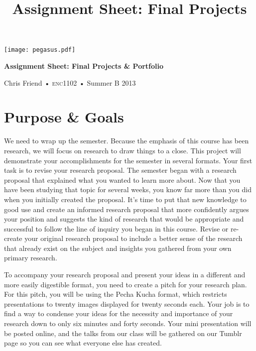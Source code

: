 \documentclass[11pt,oneside]{amsart}	%
\title[Final Projects]{Assignment Sheet: Final Projects}
\begin{document}
%
\thispagestyle{empty}

\vspace{-2in}
\begin{center}
\huge
{\texttt{[image: pegasus.pdf]}}

\textbf{Assignment Sheet: Final Projects \& Portfolio}

{\normalsize Chris Friend • \textsc{enc1102} • Summer B 2013}
\end{center}
\vspace{1.5\baselineskip}

\section{Purpose \& Goals} %
\label{sec:purpose}
We need to wrap up the semester. Because the emphasis of this course has been research, we will focus on research to draw things to a close. This project will demonstrate your accomplishments for the semester in several formats. Your first task is to revise your research proposal. The semester began with a research proposal that explained what you wanted to learn more about. Now that you have been studying that topic for several weeks, you know far more than you did when you initially created the proposal. It's time to put that new knowledge to good use and create an informed research proposal that more confidently argues your position and suggests the kind of research that would be appropriate and successful to follow the line of inquiry you began in this course. Revise or re-create your original research proposal to include a better sense of the research that already exist on the subject and insights you gathered from your own primary research.

To accompany your research proposal and present your ideas in a different and more easily digestible format, you need to create a pitch for your research plan. For this pitch, you will be using the Pecha Kucha format, which restricts presentations to twenty images displayed for twenty seconds each. Your job is to find a way to condense your ideas for the necessity and importance of your research down to only six minutes and forty seconds. Your mini presentation will be posted online, and the talks from our class will be gathered on our Tumblr page so you can see what everyone else has created.
\end{document}
